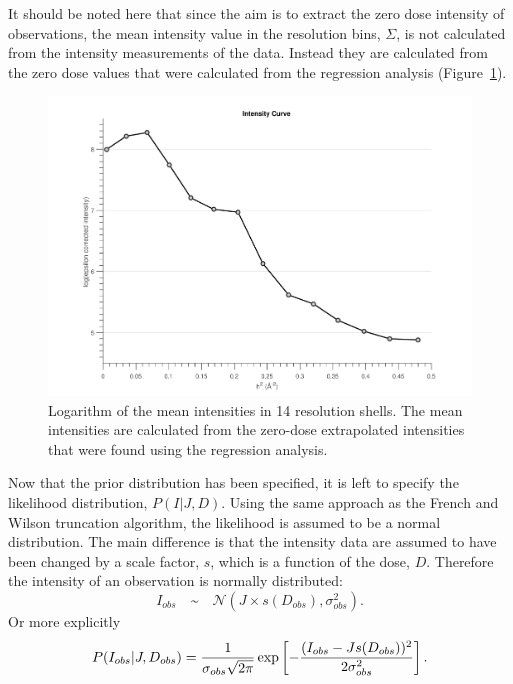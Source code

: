 It should be noted here that since the aim is to extract the zero dose intensity of observations, the mean intensity value in the resolution bins, $\Sigma$, is not calculated from the intensity measurements of the data.
Instead they are calculated from the zero dose values that were calculated from the regression analysis (Figure~\ref{fig:Zero-dose mean intensity in resolution shells - Extrapolation method}).
\begin{figure}
  \centering
    \includegraphics[width=1\textwidth]{figures/zde/extrapolationscaling.pdf}
    \caption{Logarithm of the mean intensities in 14 resolution shells.
    The mean intensities are calculated from the zero-dose extrapolated intensities that were found using the regression analysis.}
    \label{fig:Zero-dose mean intensity in resolution shells - Extrapolation method}
\end{figure}

Now that the prior distribution has been specified, it is left to specify the likelihood distribution, $P(I | J, D)$.
Using the same approach as the French and Wilson truncation algorithm, the likelihood is assumed to be a normal distribution.
The main difference is that the intensity data are assumed to have been changed by a scale factor, $s$, which is a function of the dose, $D$.
Therefore the intensity of an observation is normally distributed:
\begin{equation}
    I_{obs} \quad \text{\textasciitilde} \quad \mathcal{N}(J \times s(D_{obs}),\sigma_{obs}^2).
    \label{eq:Normally distributed intensity - Extrapolation method}
\end{equation}
Or more explicitly
\begin{equation}
    P(I_{obs} | J, D_{obs}) = \frac{1}{\sigma_{obs} \sqrt{2\pi}} \exp \left[-\frac{(I_{obs} - J s(D_{obs}))^2}{2 \sigma^2_{obs}} \right].
    \label{eq:Normally distributed intensity full equation - Extrapolation method}
\end{equation}

